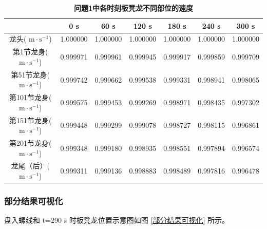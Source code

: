 \documentclass[zihao=-4, UTF8]{article}		%
\theoremstyle{MyLineTheoremStyle} %
\theoremstyle{MyBlockTheoremStyle} %
\theoremstyle{MySubsubsectionStyle} %
\begin{document}
\begin{table}[H]
    \centering\small
    \caption{\textbf{问题1中各时刻板凳龙不同部位的速度}}
    \label{问题1速度结果}
    \begin{tabular}{|c|c|c|c|c|c|c|}
        \hline
        & 0 s & 60 s & 120 s & 180 s & 240 s & 300 s\\ \hline
        龙头( $\mathrm{m}\cdot \mathrm{s}^{-1}$) &1.000000&1.000000&1.000000&1.000000&1.000000&1.000000\\ \hline
        第1节龙身( $\mathrm{m}\cdot \mathrm{s}^{-1}$) &0.999971&0.999961&0.999945&0.999917&0.999859&0.999709\\ \hline
        第51节龙身( $\mathrm{m}\cdot \mathrm{s}^{-1}$) &0.999742&0.999662&0.999538&0.999331&0.998941&0.998065\\ \hline
        第101节龙身( $\mathrm{m}\cdot \mathrm{s}^{-1}$) &0.999575&0.999453&0.999269&0.998971&0.998435&0.997302\\ \hline
        第151节龙身( $\mathrm{m}\cdot \mathrm{s}^{-1}$) &0.999448&0.999299&0.999078&0.998727&0.998115&0.996861\\ \hline
        第201节龙身( $\mathrm{m}\cdot \mathrm{s}^{-1}$) &0.999348&0.999180&0.998935&0.998551&0.997894&0.996574\\ \hline
        龙尾（后）( $\mathrm{m}\cdot \mathrm{s}^{-1}$) &0.999311&0.999136&0.998883&0.998489&0.997816&0.996478\\ \hline
    \end{tabular}
\end{table}

\newpage
\subsubsection{部分结果可视化}

盘入螺线和 t=290 s 时板凳龙位置示意图如图 \ref*{部分结果可视化} 所示。
\end{document}
